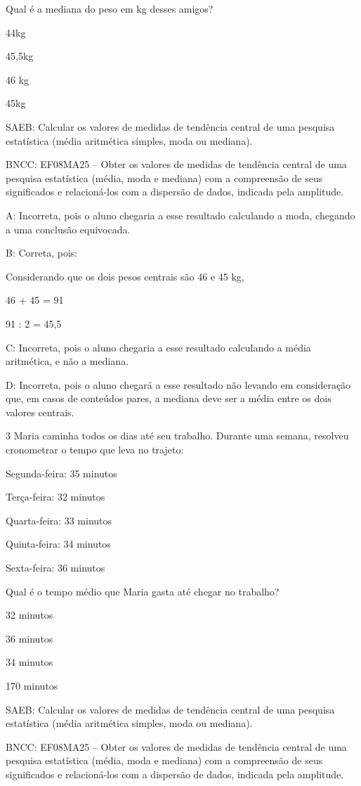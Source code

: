 {Qual é a mediana do peso em kg desses amigos?
\item 44kg
\item 45,5kg
\item 46 kg
\item 45kg

SAEB: Calcular os valores de medidas de tendência central de uma
pesquisa estatística (média aritmética simples, moda ou mediana).

BNCC: EF08MA25 -- Obter os valores de medidas de tendência central de
uma pesquisa estatística (média, moda e mediana) com a compreensão de
seus significados e relacioná-los com a dispersão de dados, indicada
pela amplitude.

A: Incorreta, pois o aluno chegaria a esse resultado calculando a moda,
chegando a uma conclusão equivocada.

B: Correta, pois:

Considerando que os dois pesos centrais são 46 e 45 kg,

46 + 45 = 91

91 : 2 = 45,5

C: Incorreta, pois o aluno chegaria a esse resultado calculando a média
aritmética, e não a mediana.

D: Incorreta, pois o aluno chegará a esse resultado não levando em
consideração que, em casos de conteúdos pares, a mediana deve ser a
média entre os dois valores centrais.

\num{3} Maria caminha todos os dias até seu trabalho. Durante uma semana,
resolveu cronometrar o tempo que leva no trajeto:

Segunda-feira: 35 minutos

Terça-feira: 32 minutos

Quarta-feira: 33 minutos

Quinta-feira: 34 minutos

Sexta-feira: 36 minutos

Qual é o tempo médio que Maria gasta até chegar no trabalho?
\item 32 minutos
\item 36 minutos
\item 34 minutos
\item 170 minutos

SAEB: Calcular os valores de medidas de tendência central de uma
pesquisa estatística (média aritmética simples, moda ou mediana).

BNCC: EF08MA25 -- Obter os valores de medidas de tendência central de
uma pesquisa estatística (média, moda e mediana) com a compreensão de
seus significados e relacioná-los com a dispersão de dados, indicada
pela amplitude.

}
